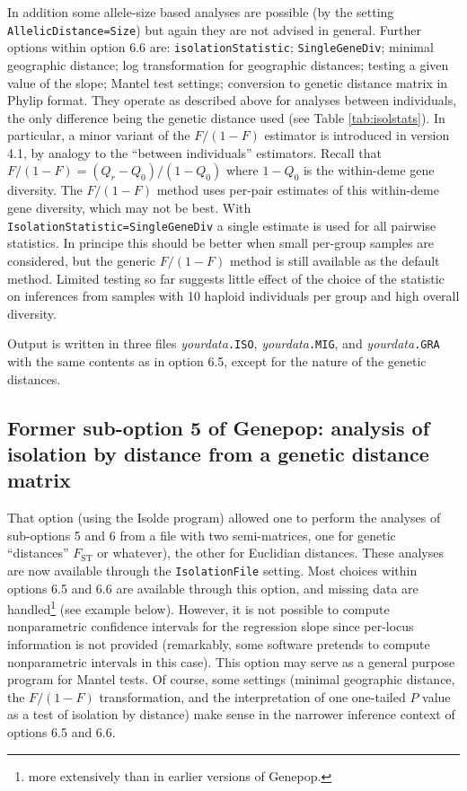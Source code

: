 \documentclass[12pt,]{book}
\let\rmarkdownfootnote\footnote%
\def\footnote{\protect\rmarkdownfootnote}
\theoremstyle{definition}
\theoremstyle{definition}
\theoremstyle{definition}
\theoremstyle{remark}
\begin{document}
In addition some allele-size based analyses are possible (by the setting
\texttt{AllelicDistance=Size}) but again they are not advised in
general. Further options within option 6.6 are:
\texttt{isolationStatistic}; \texttt{SingleGeneDiv}; minimal geographic
distance; log transformation for geographic distances; testing a given
value of the slope; Mantel test settings; conversion to genetic distance
matrix in Phylip format. They operate as described above for analyses
between individuals, the only difference being the genetic distance used
(see Table \ref{tab:isolstats}). In particular, a minor variant of the
\(F/(1-F)\) estimator is introduced in version 4.1, by analogy to the
``between individuals'' estimators. Recall that
\(F/(1-F)=(Q_r-Q_0)/(1-Q_0)\) where \(1-Q_0\) is the within-deme gene
diversity. The \(F/(1-F)\) method uses per-pair estimates of this
within-deme gene diversity, which may not be best. With
\texttt{IsolationStatistic=SingleGeneDiv} a single estimate is used for
all pairwise statistics. In principe this should be better when small
per-group samples are considered, but the generic \(F/(1-F)\) method is
still available as the default method. Limited testing so far suggests
little effect of the choice of the statistic on inferences from samples
with 10 haploid individuals per group and high overall diversity.

Output is written in three files \emph{yourdata}\texttt{.ISO},
\emph{yourdata}\texttt{.MIG}, and \emph{yourdata}\texttt{.GRA} with the
same contents as in option 6.5, except for the nature of the genetic
distances.

\subsection{Former sub-option 5 of Genepop: analysis of isolation by
distance from a genetic distance
matrix}\label{former-sub-option-5-of-genepop-analysis-of-isolation-by-distance-from-a-genetic-distance-matrix}

That option (using the Isolde program) allowed one
to perform the analyses of sub-options 5 and 6 from a file with two
semi-matrices, one for genetic ``distances'' \(F_{\mathrm{ST}}\) or
whatever), the other for Euclidian distances. These analyses are now
available through the
\texttt{IsolationFile} setting. Most
choices within options 6.5 and 6.6 are available through this option,
and missing data are handled\footnote{more extensively than in earlier
  versions of Genepop.} (see example below). However, it is not possible
to compute nonparametric confidence intervals for the regression slope
since per-locus information is not provided (remarkably, some software
pretends to compute nonparametric intervals in this case). This option
may serve as a general purpose program for Mantel tests. Of course, some
settings (minimal geographic distance, the \(F/(1-F)\) transformation,
and the interpretation of one one-tailed \(P\) value as a test of
isolation by distance) make sense in the narrower inference context of
options 6.5 and 6.6.
\end{document}
